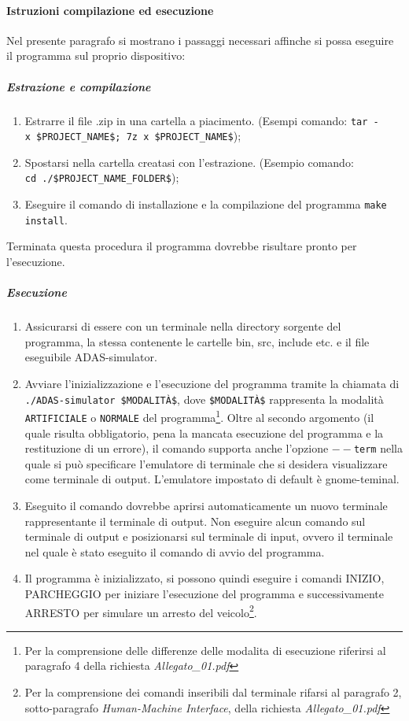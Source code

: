 \documentclass[11pt, openany]{article}
\theoremstyle{definition}
\theoremstyle{plain}
\theoremstyle{remark}
\begin{document}
		\paragraph{Istruzioni compilazione ed esecuzione}
			Nel presente paragrafo si mostrano i passaggi necessari affinche si possa eseguire il programma sul proprio dispositivo:
			\subparagraph{Estrazione e compilazione}
				\begin{enumerate}
					\item Estrarre il file .zip in una cartella a piacimento. (Esempi comando: \texttt{tar~-x~\$PROJECT\_NAME\$; \texttt{7z~x~\$PROJECT\_NAME\$}});
					\item Spostarsi nella cartella creatasi con l'estrazione. (Esempio comando: \texttt{cd~./\$PROJECT\_NAME\_FOLDER\$});
					\item Eseguire il comando di installazione e la compilazione del programma \texttt{make install}.
				\end{enumerate}
				Terminata questa procedura il programma dovrebbe risultare pronto per l'esecuzione.
				\subparagraph{Esecuzione}
					\begin{enumerate}
						\item Assicurarsi di essere con un terminale nella directory sorgente del programma, la stessa contenente le cartelle bin, src, include etc. e il file eseguibile ADAS-simulator.
						\item Avviare l'inizializzazione e l'esecuzione del programma tramite la chiamata di \texttt{./ADAS-simulator \$MODALITÀ\$}, dove \texttt{\$MODALITÀ\$} rappresenta la modalità \texttt{ARTIFICIALE} o \texttt{NORMALE} del programma\footnote{Per la comprensione delle differenze delle modalita di esecuzione riferirsi al paragrafo 4 della richiesta \textit{Allegato\_01.pdf}}. Oltre al secondo argomento (il quale risulta obbligatorio, pena la mancata esecuzione del programma e la restituzione di un errore), il comando supporta anche l'opzione \texttt{$--$term} nella quale si può specificare l'emulatore di terminale che si desidera visualizzare come terminale di output. L'emulatore impostato di default è gnome-teminal.
						\item Eseguito il comando dovrebbe aprirsi automaticamente un nuovo terminale rappresentante il terminale di output. Non eseguire alcun comando sul terminale di output e posizionarsi sul terminale di input, ovvero il terminale nel quale è stato eseguito il comando di avvio del programma.
						\item Il programma è inizializzato, si possono quindi eseguire i comandi INIZIO, PARCHEGGIO per iniziare l'esecuzione del programma e successivamente ARRESTO per simulare un arresto del veicolo\footnote{Per la comprensione dei comandi inseribili dal terminale rifarsi al paragrafo 2, sotto-paragrafo \textit{Human-Machine Interface}, della richiesta \textit{Allegato\_01.pdf}}.
				\end{enumerate}
\end{document}
